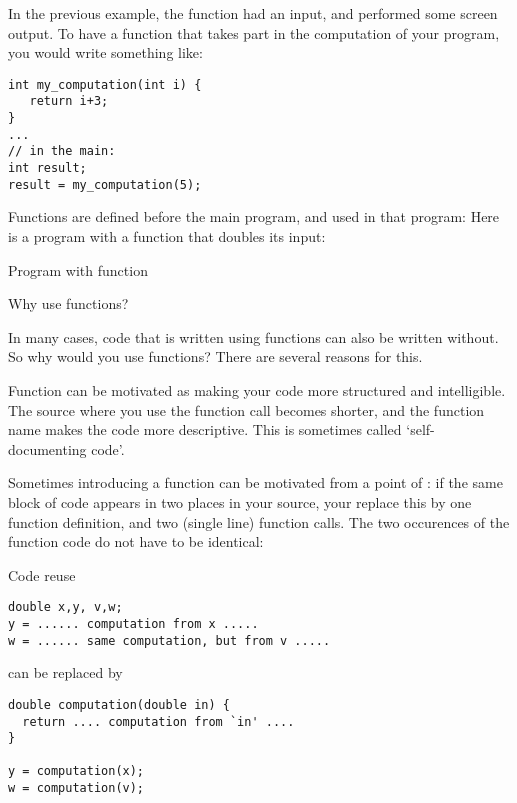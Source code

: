 In the previous example, the function had an input, and performed some
screen output. To have a function that takes part in the computation
of your program, you would write something like:
\begin{verbatim}
int my_computation(int i) {
   return i+3;
}
...
// in the main:
int result;
result = my_computation(5);
\end{verbatim}

Functions are defined before the main program, and used in that program:
Here is a program with a function that doubles its input:

\begin{block}{Program with function}
  \label{sl:fun-example}
\end{block}

 {Why use functions?}

In many cases, code that is written using functions can also be
written without. So why would you use functions? There are several
reasons for this.

Function can be motivated as making your code more structured and intelligible.
The source where you use the function call becomes shorter,
and the function
name makes the code more descriptive. This is sometimes called
`self-documenting code'.

Sometimes introducing a function can be motivated from a point of
: if the same block of code appears in two
places in your source, your replace this by one function definition,
and two (single line) function calls.
The two occurences of the function code do not have to be identical:


\begin{block}{Code reuse}
  \label{sl:reuse}
\begin{verbatim}
double x,y, v,w;
y = ...... computation from x .....
w = ...... same computation, but from v .....
\end{verbatim}
can be replaced by
\begin{verbatim}
double computation(double in) {
  return .... computation from `in' ....
}

y = computation(x);
w = computation(v);
\end{verbatim}
\end{block}

